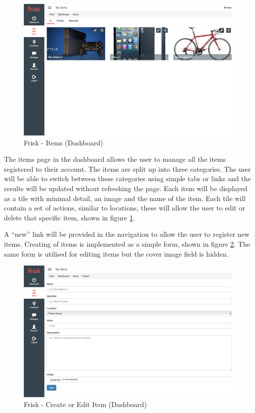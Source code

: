 \begin{figure}[H]
	\centering
	\includegraphics[width=1.0\textwidth]{images/Frisk/Dashboard_Items}
	\caption{Frisk - Items (Dashboard)} \label{fig:Dashboard_Items}
\end{figure}

The items page in the dashboard allows the user to manage all the items registered to their account. The items are split up into three categories. The user will be able to switch between these categories using simple tabs or links and the results will be updated without refreshing the page. Each item will be displayed as a tile with minimal detail, an image and the name of the item. Each tile will contain a set of actions, similar to locations, these will allow the user to edit or delete that specific item, shown in figure \ref{fig:Dashboard_Items}.

A ``new'' link will be provided in the navigation to allow the user to register new items. Creating of items is implemented as a simple form, shown in figure \ref{fig:Dashboard_Create_Item}. The same form is utilised for editing items but the cover image field is hidden.

\begin{figure}[H]
	\centering
	\includegraphics[width=1.0\textwidth]{images/Frisk/Dashboard_Create_Item}
	\caption{Frisk - Create or Edit Item (Dashboard)} \label{fig:Dashboard_Create_Item}
\end{figure}

